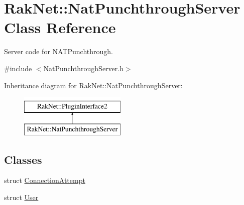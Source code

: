 \hypertarget{class_rak_net_1_1_nat_punchthrough_server}{\section{Rak\-Net\-:\-:Nat\-Punchthrough\-Server Class Reference}
\label{class_rak_net_1_1_nat_punchthrough_server}
}


Server code for N\-A\-T\-Punchthrough.  




{\ttfamily \#include $<$Nat\-Punchthrough\-Server.\-h$>$}

Inheritance diagram for Rak\-Net\-:\-:Nat\-Punchthrough\-Server\-:\begin{figure}[H]
\begin{center}
\leavevmode
\includegraphics[height=2.000000cm]{class_rak_net_1_1_nat_punchthrough_server}
\end{center}
\end{figure}
\subsection*{Classes}
\begin{DoxyCompactItemize}
\item 
struct \hyperlink{struct_rak_net_1_1_nat_punchthrough_server_1_1_connection_attempt}{Connection\-Attempt}
\item 
struct \hyperlink{struct_rak_net_1_1_nat_punchthrough_server_1_1_user}{User}
\end{DoxyCompactItemize}
